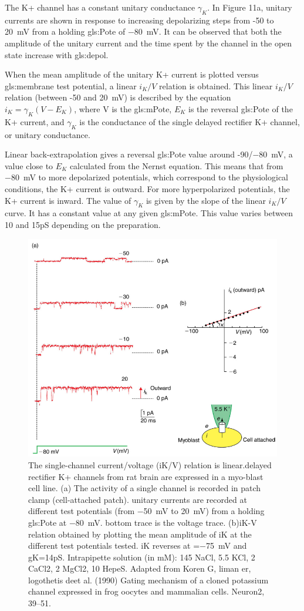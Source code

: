 \documentclass[../../Orator]{subfiles}
\begin{document}
The K+ channel has a constant unitary conductance \(\gamma_K\). In Figure 11a, unitary currents are shown in response to increasing depolarizing steps from -50 to \qty{20}{\mV} from a holding \gls{gls:Pote} of \qty{-80}{\mV}. It can be observed that both the amplitude of the unitary current and the time spent by the channel in the open state increase with \gls{gls:depol}. 

When the mean amplitude of the unitary K+ current is plotted versus \gls{gls:membrane} test potential, a linear \(i_K/V\) relation is obtained.  This linear \(i_K/V\) relation (between -50 and \qty{20}{\mV}) is described by the equation \(i_K = \gamma_K(V-E_K)\), where V is the \gls{gls:mPote}, \(E_K\) is the reversal \gls{gls:Pote} of the K+ current, and \(\gamma_K\) is the conductance of the single delayed rectifier K+ channel, or unitary conductance. 

Linear back-extrapolation gives a reversal \gls{gls:Pote} value around -90/\qty{-80}{\mV}, a value close to \(E_K\) calculated from the Nernst equation. This means that from \qty{-80}{\mV} to more depolarized potentials, which correspond to the physiological conditions, the K+ current is outward. For more hyperpolarized potentials, the K+ current is inward. The value of \(\gamma_K\) is given by the slope of the linear \(i_K/V\)curve. It has a constant value at any given \gls{gls:mPote}. This value varies between 10 and 15pS depending on the preparation. 

\begin{figure}[H]
     \centering
     \includegraphics[width=0.5\linewidth]{Pictures//Anakin/I-V.K.png}
     \caption{The single-channel current/voltage (iK/V) relation is linear.delayed rectifier K+ channels from rat brain are expressed in a myo-blast cell line. (a) The activity of a single channel is recorded in patch clamp (cell-attached patch). unitary currents are recorded at different test potentials (from \qty{-50}{\mV} to \qty{20}{\mV}) from a holding \gls{gls:Pote} at \qty{-80}{\mV}. bottom trace is the voltage trace. (b)iK-V relation obtained by plotting the mean amplitude of iK at the different test potentials tested. iK reverses at =\qty{-75}{\mV} and gK=14pS. Intrapipette solution (in mM): 145 NaCl, 5.5 KCl, 2 CaCl2, 2 MgCl2, 10 HepeS. Adapted from Koren G, liman er, logothetis deet al. (1990) Gating mechanism of a cloned potassium channel expressed in frog oocytes and mammalian cells. Neuron2, 39–51.}
     \label{fig:enter-label}
 \end{figure} 
\end{document}
